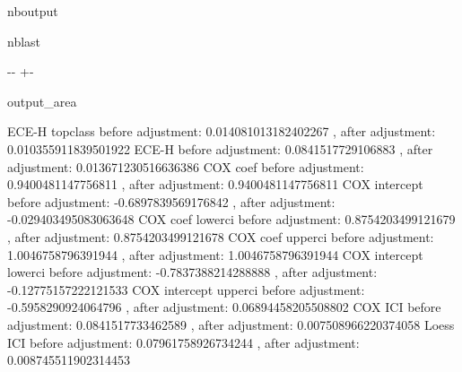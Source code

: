 \documentclass[letterpaper,10pt,english]{sphinxmanual}
\begin{document}
\begin{sphinxuseclass}{nboutput}
\begin{sphinxuseclass}{nblast}
{

\kern-\sphinxverbatimsmallskipamount\kern-\baselineskip
\kern+\FrameHeightAdjust\kern-\fboxrule
\vspace{\nbsphinxcodecellspacing}

\begin{sphinxuseclass}{output_area}
\begin{sphinxuseclass}{}


\begin{sphinxVerbatim}[commandchars=\\\{\}]
ECE-H topclass
before adjustment: 0.014081013182402267 , after adjustment: 0.010355911839501922
ECE-H
before adjustment: 0.0841517729106883 , after adjustment: 0.013671230516636386
COX coef
before adjustment: 0.9400481147756811 , after adjustment: 0.9400481147756811
COX intercept
before adjustment: -0.6897839569176842 , after adjustment: -0.029403495083063648
COX coef lowerci
before adjustment: 0.8754203499121679 , after adjustment: 0.8754203499121678
COX coef upperci
before adjustment: 1.0046758796391944 , after adjustment: 1.0046758796391944
COX intercept lowerci
before adjustment: -0.7837388214288888 , after adjustment: -0.12775157222121533
COX intercept upperci
before adjustment: -0.5958290924064796 , after adjustment: 0.06894458205508802
COX ICI
before adjustment: 0.0841517733462589 , after adjustment: 0.007508966220374058
Loess ICI
before adjustment: 0.07961758926734244 , after adjustment: 0.008745511902314453
\end{sphinxVerbatim}



\end{sphinxuseclass}
\end{sphinxuseclass}
}

\end{sphinxuseclass}
\end{sphinxuseclass}
\end{document}
